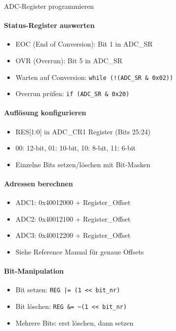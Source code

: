 \begin{KR}{ADC-Register programmieren}\\
    \paragraph{Status-Register auswerten}
    \begin{itemize}
        \item EOC (End of Conversion): Bit 1 in ADC\_SR
        \item OVR (Overrun): Bit 5 in ADC\_SR
        \item Warten auf Conversion: \texttt{while (!(ADC\_SR \& 0x02))}
        \item Overrun prüfen: \texttt{if (ADC\_SR \& 0x20)}
    \end{itemize}
    
    \paragraph{Auflösung konfigurieren}
    \begin{itemize}
        \item RES[1:0] in ADC\_CR1 Register (Bits 25:24)
        \item 00: 12-bit, 01: 10-bit, 10: 8-bit, 11: 6-bit
        \item Einzelne Bits setzen/löschen mit Bit-Masken
    \end{itemize}
    
    \paragraph{Adressen berechnen}
    \begin{itemize}
        \item ADC1: 0x40012000 + Register\_Offset
        \item ADC2: 0x40012100 + Register\_Offset  
        \item ADC3: 0x40012200 + Register\_Offset
        \item Siehe Reference Manual für genaue Offsets
    \end{itemize}
    
    \paragraph{Bit-Manipulation}
    \begin{itemize}
        \item Bit setzen: \texttt{REG |= (1 << bit\_nr)}
        \item Bit löschen: \texttt{REG \&= \~{}(1 << bit\_nr)}
        \item Mehrere Bits: erst löschen, dann setzen
    \end{itemize}
\end{KR}

